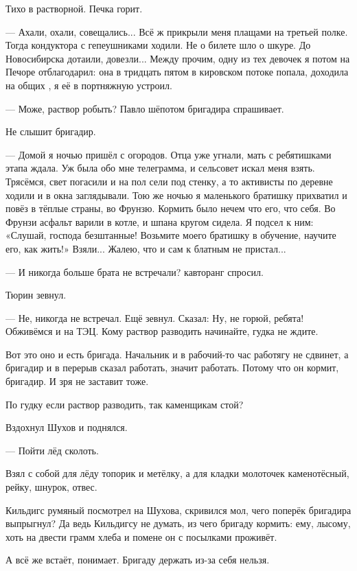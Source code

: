 Тихо в растворной. Печка горит.

--- Ахали, охали, совещались... Всё ж прикрыли меня плащами на третьей полке. Тогда кондуктора с
гепеушниками ходили. Не о билете шло \dash о шкуре. До Новосибирска дотаили, довезли... Между
прочим, одну из тех девочек я потом на Печоре отблагодарил: она в тридцать пятом в кировском
потоке попала, доходила на общих , я её в портняжную устроил.

--- Може, раствор робыть? \dash Павло шёпотом бригадира спрашивает.

Не слышит бригадир.

--- Домой я ночью пришёл с огородов. Отца уже угнали, мать с ребятишками этапа ждала. Уж была
обо мне телеграмма, и сельсовет искал меня взять. Трясёмся, свет погасили и на пол сели под
стенку, а то активисты по деревне ходили и в окна заглядывали. Тою же ночью я маленького
братишку прихватил и повёз в тёплые страны, во Фрунзю. Кормить было нечем что его, что себя.
Во Фрунзи асфальт варили в котле, и шпана кругом сидела. Я подсел к ним: «Слушай, господа
безштанные! Возьмите моего братишку в обучение, научите его, как жить!» Взяли... Жалею, что и
сам к блатным не пристал...

--- И никогда больше брата не встречали? \dash кавторанг спросил.

Тюрин зевнул.

--- Не, никогда не встречал. \dash Ещё зевнул. Сказал: \Dash Ну, не горюй, ребята! Обживёмся и на ТЭЦ.
Кому раствор разводить \dash начинайте, гудка не ждите.

Вот это оно и есть \dash бригада. Начальник и в рабочий-то час работягу не сдвинет, а бригадир и в
перерыв сказал \dash работать, значит \dash работать. Потому что он кормит, бригадир. И зря не
заставит тоже.

По гудку если раствор разводить, так каменщикам \dash стой?

Вздохнул Шухов и поднялся.

--- Пойти лёд сколоть.

Взял с собой для лёду топорик и метёлку, а для кладки \dash молоточек каменотёсный, рейку,
шнурок, отвес.

Кильдигс румяный посмотрел на Шухова, скривился \dash мол, чего поперёк бригадира выпрыгнул? Да
ведь Кильдигсу не думать, из чего бригаду кормить: ему, лысому, хоть на двести грамм хлеба и
помене \dash он с посылками проживёт.

А всё же встаёт, понимает. Бригаду держать из-за себя нельзя.

